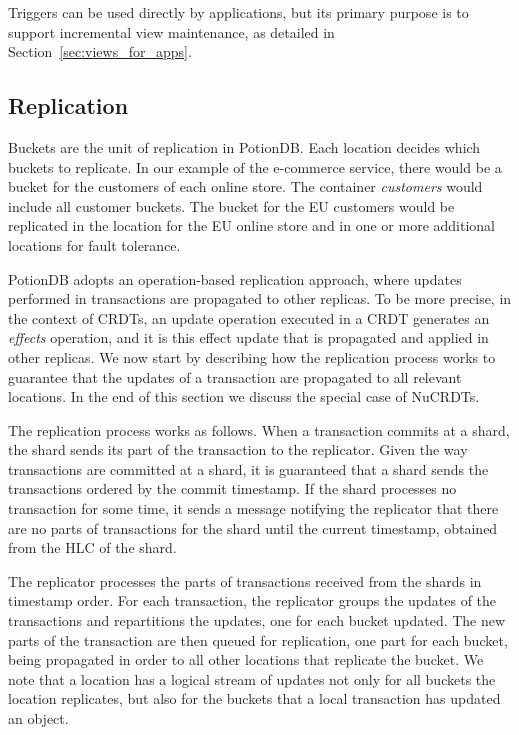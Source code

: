 \documentclass[sigplan,review,anonymous]{acmart}
\begin{document}
Triggers can be used directly by applications, but its primary purpose is to support
incremental view maintenance, as detailed in Section~\ref{sec:views_for_apps}.

\subsection{Replication}
\label{sec:replication}

Buckets are the unit of replication in PotionDB.  Each location decides which buckets to replicate.
In our example of the e-commerce service, there would be a bucket for 
the customers of each online store.  The container \emph{customers} would include all customer buckets.
The bucket for the EU customers would be replicated in the location for the EU online store and
in one or more additional locations for fault tolerance.

PotionDB adopts an operation-based replication approach, where updates performed in 
transactions are propagated to other replicas. To be more precise, in the context of CRDTs, an update
operation executed in a CRDT generates an \emph{effects} operation, and it is this effect update that is
propagated and applied in other replicas. We now start by describing how the replication process works to
guarantee that the updates of a transaction are propagated to all relevant locations. In the end of this section 
we discuss the special case of NuCRDTs.

The replication process works as follows. 
When a transaction commits at a shard, the shard sends its part of the transaction to the replicator.  
Given the way transactions are committed at a shard, it is guaranteed that a shard sends the transactions
ordered by the commit timestamp.
If the shard processes no transaction for some time, it sends a message notifying the replicator that there are
no parts of transactions for the shard until the current timestamp, obtained from the HLC of the shard.

The replicator processes the parts of transactions received from the shards in timestamp order. 
For each transaction, the replicator groups the updates of the transactions and repartitions the
updates, one for each bucket updated. The new parts of the transaction are then queued 
for replication, one part for each bucket, being propagated in order to all other locations that 
replicate the bucket. 
We note that a location has a logical stream of updates not only for all buckets the location replicates,
but also for the buckets that a local transaction has updated an object.
\end{document}
